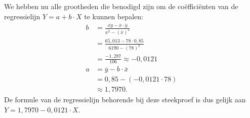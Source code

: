 \begin{enumerate}[label=(\alph*)]
{        We hebben nu alle grootheden die benodigd zijn om de co\"effici\"enten van de regressielijn $Y = a + b \cdot X$ te kunnen bepalen:
        \begin{align*}
            b   &= \frac{\overline{xy} - \overline{x} \cdot \overline{y}}{\overline{x^2} - (\overline{x})^2} \\
                &= \frac{65,013 - 78 \cdot 0,85}{6190 - (78)^2} \\
                &= \frac{-1,287}{106} \approx -0,0121 \\
            a   &= \overline{y} - b \cdot \overline{x} \\
                &= 0,85 - ({-0,0121} \cdot 78) \\
                &\approx 1,7970.
        \end{align*}
        De formule van de regressielijn behorende bij deze steekproef is dus gelijk aan $Y = 1,7970-0,0121 \cdot X$.    
        
        \begin{center}
        \end{center}
    }


\end{enumerate}
